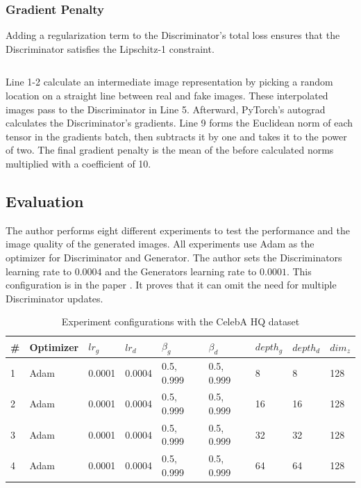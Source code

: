 \newpage

\subsubsection{Gradient Penalty}
\label{sec:gradient_penalty}

Adding a regularization term to the Discriminator's total loss ensures that the Discriminator satisfies the  Lipschitz-1 constraint.

\begin{listing}[H]
\inputminted{python}{resources/codes/gradient_penalty.py}
\end{listing}

Line 1-2 calculate an intermediate image representation by picking a random location on a straight line between real and fake images. These interpolated images pass to the Discriminator in Line 5. Afterward, PyTorch's autograd calculates the Discriminator's gradients. Line 9 forms the Euclidean norm of each tensor in the gradients batch, then subtracts it by one and takes it to the power of two. The final gradient penalty is the mean of the before calculated norms multiplied with a coefficient of 10.

\newpage

\subsection{Evaluation}
\label{sec:evaluation}


The author performs eight different experiments to test the performance and the image quality of the generated images. All experiments use Adam as the optimizer for Discriminator and Generator. The author sets the Discriminators learning rate to $ 0.0004 $ and the Generators learning rate to $ 0.0001 $. This configuration is in the paper  \cite{heusel2018ttur}. It proves that it can omit the need for multiple Discriminator updates. \\


\begin{table}[H]
    \centering
    \begin{tabular}{@{}lllllllll@{}}
    \toprule
    \# & Optimizer & $ lr_{g} $ & $ lr_{d} $ & $ \beta_{g} $ & $ \beta_{d} $ & $ depth_{g} $ & $ depth_{d} $ & $ dim_{z} $ \\ \midrule
    1 & Adam & 0.0001 & 0.0004 & 0.5, 0.999 & 0.5, 0.999 & 8  & 8  & 128 \\
    2 & Adam & 0.0001 & 0.0004 & 0.5, 0.999 & 0.5, 0.999 & 16 & 16 & 128 \\
    3 & Adam & 0.0001 & 0.0004 & 0.5, 0.999 & 0.5, 0.999 & 32 & 32 & 128 \\
    4 & Adam & 0.0001 & 0.0004 & 0.5, 0.999 & 0.5, 0.999 & 64 & 64 & 128 \\ \bottomrule
    \end{tabular}
    \caption{Experiment configurations with the CelebA HQ dataset}
\label{tab:experiments_celeba_hq}
\end{table}

